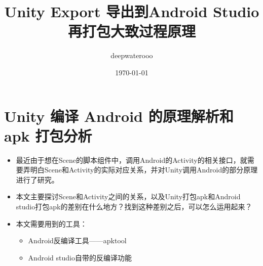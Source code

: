 \documentclass[9pt, b5paper]{article}
\author{deepwaterooo}
\date{\today}
\title{Unity Export 导出到Android Studio再打包大致过程原理}
\begin{document}
\maketitle
\tableofcontents


\section{Unity 编译 Android 的原理解析和 apk 打包分析}
\label{sec-1}
\begin{itemize}
\item 最近由于想在Scene的脚本组件中，调用Android的Activity的相关接口，就需要弄明白Scene和Activity的实际对应关系，并对Unity调用Android的部分原理进行了研究。
\item 本文主要探讨Scene和Activity之间的关系，以及Unity打包apk和Android studio打包apk的差别在什么地方？找到这种差别之后，可以怎么运用起来？
\item 本文需要用到的工具：
\begin{itemize}
\item Android反编译工具——apktool
\item Android studio自带的反编译功能
\end{itemize}
\end{itemize}
\end{document}
